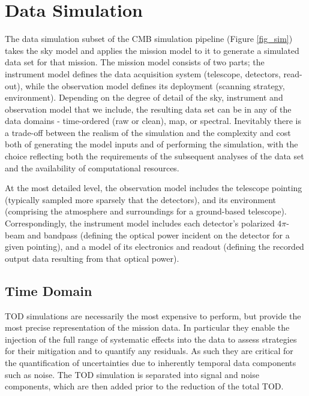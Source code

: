  
\section{Data Simulation}
\label{sec_datasim}

The data simulation subset of the CMB simulation pipeline (Figure \ref{fig_sim}) takes the sky model and applies the mission model to it to generate a simulated data set for that mission. The mission model consists of two parts; the instrument model defines the data acquisition system (telescope, detectors, read-out), while the observation model defines its deployment (scanning strategy, environment). Depending on the degree of detail of the sky, instrument and observation model that we include, the resulting data set can be in any of the data domains - time-ordered (raw or clean), map, or spectral. Inevitably there is a trade-off between the realism of the simulation and the complexity and cost both of generating the model inputs and of performing the simulation, with the choice reflecting both the requirements of the subsequent analyses of the data set and the availability of computational resources.

At the most detailed level, the observation model includes the telescope pointing (typically sampled more sparsely that the detectors), and its environment (comprising the atmosphere and surroundings for a ground-based telescope). Correspondingly, the instrument model includes each detector's polarized $4 \pi$-beam and bandpass (defining the optical power incident on the detector for a given pointing), and a model of its electronics and readout (defining the recorded output data resulting from that optical power).

\subsection{Time Domain}

TOD simulations are necessarily the most expensive to perform, but provide the most precise representation of the mission data. In particular they enable the injection of the full range of systematic effects into the data to assess strategies for their mitigation and to quantify any residuals. As such they are critical for the quantification of uncertainties due to inherently temporal data components such as noise. The TOD simulation is separated into signal and noise components, which are then added prior to the reduction of the total TOD.

